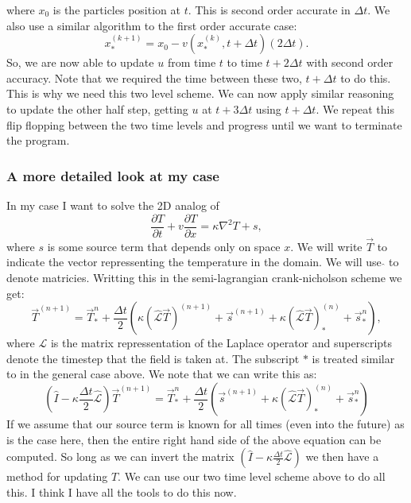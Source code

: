 \documentclass{article}
\begin{document}
where $x_0$ is the particles position at $t$. This is second order accurate in $\Delta t$. We also use a similar algorithm to the first order accurate case:
\begin{equation}
	x_{*}^{(k+1)} = x_0 - v(x_{*}^{(k)}, t + \Delta t) (2 \Delta t).
\end{equation}
So, we are now able to update $u$ from time $t$ to time $t+2\Delta t$ with second order accuracy. Note that we required the time between these two, $t + \Delta t$ to do this. This is why we need this two level scheme. We can now apply similar reasoning to update the other half step, getting $u$ at $t+3 \Delta t$ using $t+ \Delta t$. We repeat this flip flopping between the two time levels and progress until we want to terminate the program.
\newline

\subsubsection*{A more detailed look at my case}
In my case I want to solve the 2D analog of
\begin{equation}
	\frac{\partial T}{\partial t} + v \frac{\partial T}{\partial x} = \kappa \nabla^2 T + s,
\end{equation}
where $s$ is some source term that depends only on space $x$.
\newline
We will write $\vec{T}$ to indicate the vector repressenting the temperature in the domain. We will use $\hat{}$ to denote matricies. Writting this in the semi-lagrangian crank-nicholson scheme we get:
\begin{equation}
	\vec{T}^{(n+1)} = \vec{T}^{n}_{*} + \frac{\Delta t}{2} ( \kappa (\hat{\mathcal{L}} \vec{T})^{(n+1)} + \vec{s}^{(n+1)} +  \kappa (\hat{\mathcal{L}} \vec{T})_{*}^{(n)} + \vec{s}^{n}_{*}),
\end{equation}
where $\mathcal{L}$ is the matrix repressentation of the Laplace operator and superscripts denote the timestep that the field is taken at. The subscript ${*}$ is treated similar to in the general case above. 
We note that we can write this as:
\begin{equation}
	(\hat{I} - \kappa \frac{\Delta t}{2} \hat{\mathcal{L}}) \vec{T}^{(n+1)} = \vec{T}^{n}_{*} + \frac{\Delta t}{2} (\vec{s}^{(n+1)} +  \kappa (\hat{\mathcal{L}} \vec{T})_{*}^{(n)} + \vec{s}^{n}_{*})
	\label{2D implicit update}
\end{equation}
If we assume that our source term is known for all times (even into the future) as is the case here,  then the entire right hand side of the above equation can be computed. So long as we can invert the matrix $(\hat{I} - \kappa \frac{\Delta t}{2} \hat{\mathcal{L}})$ we then have a method for updating $T$. We can use our two time level scheme above to do all this. I think I have all the tools to do this now.
\end{document}
